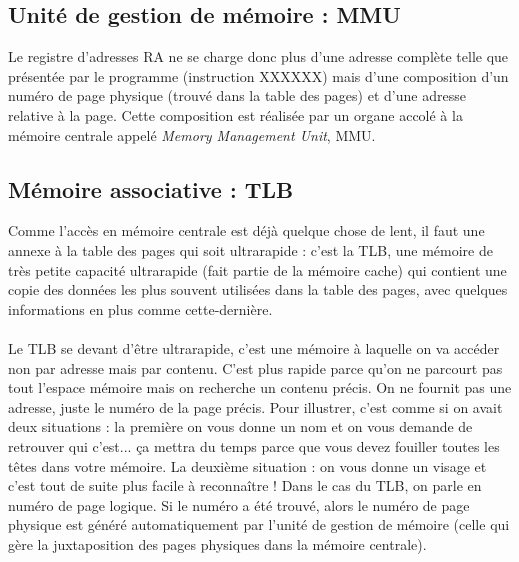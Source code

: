 \documentclass[12pt,a4paper]{report}
\begin{document}

\subsection{Unité de gestion de mémoire : MMU}
Le registre d'adresses RA ne se charge donc plus d'une adresse complète telle que présentée par le programme (instruction XXXXXX) mais d'une composition d'un numéro de page physique (trouvé dans la table des pages) et d'une adresse relative à la page. Cette composition est réalisée par un organe accolé à la mémoire centrale appelé \textit{Memory Management Unit}, MMU.
\subsection{Mémoire associative : TLB}
Comme l'accès en mémoire centrale est déjà quelque chose de lent, il faut une annexe à la table des pages qui soit ultrarapide : c'est la TLB, une mémoire de très petite capacité ultrarapide (fait partie de la mémoire cache) qui contient une copie des données les plus souvent utilisées dans la table des pages, avec quelques informations en plus comme cette-dernière. \\
\\
Le TLB se devant d'être ultrarapide, c'est une mémoire à laquelle on va accéder non par adresse mais par contenu. C'est plus rapide parce qu'on ne parcourt pas tout l'espace mémoire mais on recherche un contenu précis. On ne fournit pas une adresse, juste le numéro de la page précis. Pour illustrer, c'est comme si on avait deux situations : la première on vous donne un nom et on vous demande de retrouver qui c'est... ça mettra du temps parce que vous devez fouiller toutes les têtes dans votre mémoire. La deuxième situation : on vous donne un visage et c'est tout de suite plus facile à reconnaître ! Dans le cas du TLB, on parle en numéro de page logique. Si le numéro a été trouvé, alors le numéro de page physique est généré automatiquement par l'unité de gestion de mémoire (celle qui gère la juxtaposition des pages physiques dans la mémoire centrale).
\end{document}

